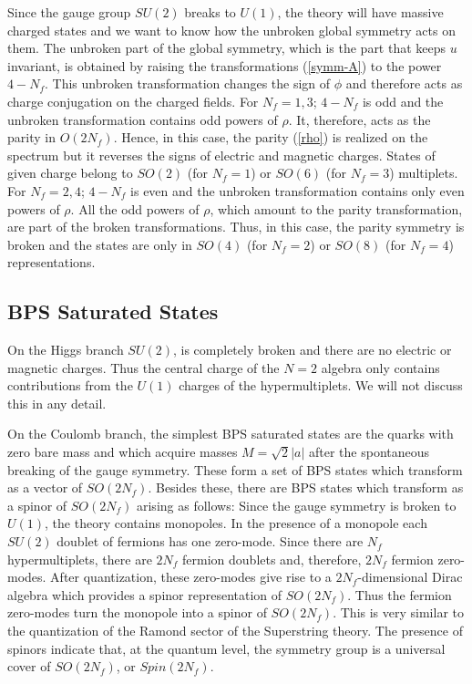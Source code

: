 Since the gauge group $SU(2)$ breaks to $U(1)$, the theory will
have massive charged states and we want to know how the unbroken
global symmetry acts on them. The unbroken part of the global
symmetry, which is the part that keeps $u$ invariant, is obtained by
raising the transformations (\ref{symm-A}) to the power $4-N_f$.
This unbroken transformation changes the sign of $\phi$ and therefore
acts as charge conjugation on the charged fields. For $N_f=1,3$;
$4-N_f$ is odd and the unbroken transformation contains odd powers of
$\rho$. It, therefore, acts as the parity in $O(2N_f)$. Hence, in this
case, the parity (\ref{rho}) is realized on the spectrum but it
reverses the signs of electric and magnetic charges. States of given
charge belong to $SO(2)$ (for $N_f=1$) or $SO(6)$ (for $N_f=3$)
multiplets. For $N_f=2,4$; $4-N_f$ is even and the unbroken
transformation contains only even powers of $\rho$. All the odd
powers of $\rho$, which amount to the parity transformation, are part
of the broken transformations. Thus, in this case, the parity symmetry
is broken and the states are only in $SO(4)$ (for $N_f=2$) or $SO(8)$
(for $N_f=4$) representations. 

\subsection{BPS Saturated States}

On the Higgs branch $SU(2)$, is completely broken and there are no
electric or magnetic charges. Thus the central charge of the $N=2$
algebra only contains contributions from the $U(1)$ charges of the
hypermultiplets. We will not discuss this in any detail. 

On the Coulomb branch, the simplest BPS saturated states are the
quarks with zero bare mass and which acquire masses $M = \sqrt{2} |a|$
after the spontaneous breaking of the gauge symmetry. These form a set
of BPS states which transform as a vector of $SO(2N_f)$. Besides
these, there are BPS states which transform as a spinor of $SO(2N_f)$
arising as follows: Since the gauge symmetry is broken to $U(1)$, the
theory contains monopoles. In the presence of a monopole each $SU(2)$
doublet of fermions has one zero-mode. Since there are $N_f$
hypermultiplets, there are $2N_f$ fermion doublets and, therefore,
$2N_f$ fermion zero-modes. After quantization, these zero-modes give
rise to a $2N_f$-dimensional Dirac algebra which provides a spinor
representation of $SO(2N_f)$. Thus the fermion zero-modes turn the
monopole into a spinor of $SO(2N_f)$. This is very similar to the
quantization of the Ramond sector of the Superstring theory. The
presence of spinors indicate that, at the quantum level, the symmetry
group is a universal cover of $SO(2N_f)$, or $Spin(2N_f)$.

